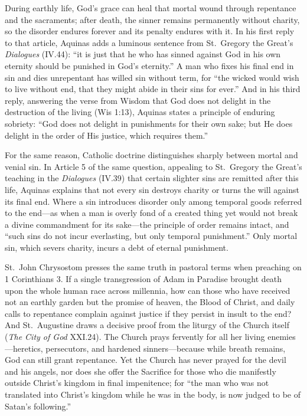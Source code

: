 During earthly life, God's grace can heal that mortal wound through repentance and the sacraments; after death, the sinner remains permanently without charity, so the disorder endures forever and its penalty endures with it. In his first reply to that article, Aquinas adds a luminous sentence from St.\ Gregory the Great's \textit{Dialogues} (IV.44): ``it is just that he who has sinned against God in his own eternity should be punished in God's eternity.'' A man who fixes his final end in sin and dies unrepentant has willed sin without term, for ``the wicked would wish to live without end, that they might abide in their sins for ever.'' And in his third reply, answering the verse from Wisdom that God does not delight in the destruction of the living (Wis 1:13), Aquinas states a principle of enduring sobriety: ``God does not delight in punishments for their own sake; but He does delight in the order of His justice, which requires them.''

For the same reason, Catholic doctrine distinguishes sharply between mortal and venial sin. In Article 5 of the same question, appealing to St.\ Gregory the Great's teaching in the \textit{Dialogues} (IV.39) that certain slighter sins are remitted after this life, Aquinas explains that not every sin destroys charity or turns the will against its final end. Where a sin introduces disorder only among temporal goods referred to the end---as when a man is overly fond of a created thing yet would not break a divine commandment for its sake---the principle of order remains intact, and ``such sins do not incur everlasting, but only temporal punishment.'' Only mortal sin, which severs charity, incurs a debt of eternal punishment.

St.\ John Chrysostom presses the same truth in pastoral terms when preaching on 1 Corinthians 3. If a single transgression of Adam in Paradise brought death upon the whole human race across millennia, how can those who have received not an earthly garden but the promise of heaven, the Blood of Christ, and daily calls to repentance complain against justice if they persist in insult to the end? And St.\ Augustine draws a decisive proof from the liturgy of the Church itself (\textit{The City of God} XXI.24). The Church prays fervently for all her living enemies---heretics, persecutors, and hardened sinners---because while breath remains, God can still grant repentance. Yet the Church has never prayed for the devil and his angels, nor does she offer the Sacrifice for those who die manifestly outside Christ's kingdom in final impenitence; for ``the man who was not translated into Christ's kingdom while he was in the body, is now judged to be of Satan's following.''

